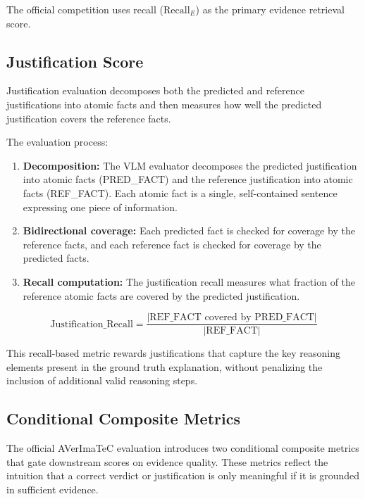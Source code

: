 The official competition uses recall ($\text{Recall}_E$) as the primary evidence retrieval score.

\subsection{Justification Score}

Justification evaluation decomposes both the predicted and reference justifications into atomic facts and then measures how well the predicted justification covers the reference facts.

The evaluation process:

\begin{enumerate}
    \item \textbf{Decomposition:} The VLM evaluator decomposes the predicted justification into atomic facts (PRED\_FACT) and the reference justification into atomic facts (REF\_FACT). Each atomic fact is a single, self-contained sentence expressing one piece of information.
    \item \textbf{Bidirectional coverage:} Each predicted fact is checked for coverage by the reference facts, and each reference fact is checked for coverage by the predicted facts.
    \item \textbf{Recall computation:} The justification recall measures what fraction of the reference atomic facts are covered by the predicted justification.
\end{enumerate}

\begin{equation}
    \text{Justification\_Recall} = \frac{|\text{REF\_FACT covered by PRED\_FACT}|}{|\text{REF\_FACT}|}
\end{equation}

This recall-based metric rewards justifications that capture the key reasoning elements present in the ground truth explanation, without penalizing the inclusion of additional valid reasoning steps.

\subsection{Conditional Composite Metrics}

The official AVerImaTeC evaluation introduces two conditional composite metrics that gate downstream scores on evidence quality. These metrics reflect the intuition that a correct verdict or justification is only meaningful if it is grounded in sufficient evidence.

